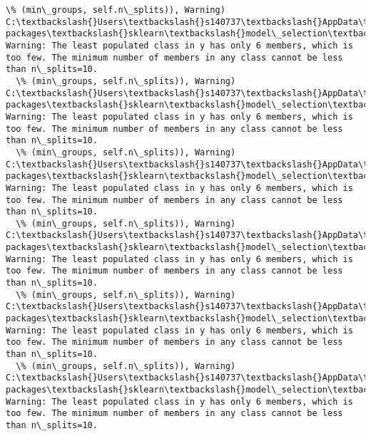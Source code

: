\documentclass[11pt]{article}
\begin{document}
\begin{Verbatim}[commandchars=\\\{\}]
  \% (min\_groups, self.n\_splits)), Warning)
C:\textbackslash{}Users\textbackslash{}s140737\textbackslash{}AppData\textbackslash{}Local\textbackslash{}Continuum\textbackslash{}anaconda3\textbackslash{}lib\textbackslash{}site-packages\textbackslash{}sklearn\textbackslash{}model\_selection\textbackslash{}\_split.py:605: Warning: The least populated class in y has only 6 members, which is too few. The minimum number of members in any class cannot be less than n\_splits=10.
  \% (min\_groups, self.n\_splits)), Warning)
C:\textbackslash{}Users\textbackslash{}s140737\textbackslash{}AppData\textbackslash{}Local\textbackslash{}Continuum\textbackslash{}anaconda3\textbackslash{}lib\textbackslash{}site-packages\textbackslash{}sklearn\textbackslash{}model\_selection\textbackslash{}\_split.py:605: Warning: The least populated class in y has only 6 members, which is too few. The minimum number of members in any class cannot be less than n\_splits=10.
  \% (min\_groups, self.n\_splits)), Warning)
C:\textbackslash{}Users\textbackslash{}s140737\textbackslash{}AppData\textbackslash{}Local\textbackslash{}Continuum\textbackslash{}anaconda3\textbackslash{}lib\textbackslash{}site-packages\textbackslash{}sklearn\textbackslash{}model\_selection\textbackslash{}\_split.py:605: Warning: The least populated class in y has only 6 members, which is too few. The minimum number of members in any class cannot be less than n\_splits=10.
  \% (min\_groups, self.n\_splits)), Warning)
C:\textbackslash{}Users\textbackslash{}s140737\textbackslash{}AppData\textbackslash{}Local\textbackslash{}Continuum\textbackslash{}anaconda3\textbackslash{}lib\textbackslash{}site-packages\textbackslash{}sklearn\textbackslash{}model\_selection\textbackslash{}\_split.py:605: Warning: The least populated class in y has only 6 members, which is too few. The minimum number of members in any class cannot be less than n\_splits=10.
  \% (min\_groups, self.n\_splits)), Warning)
C:\textbackslash{}Users\textbackslash{}s140737\textbackslash{}AppData\textbackslash{}Local\textbackslash{}Continuum\textbackslash{}anaconda3\textbackslash{}lib\textbackslash{}site-packages\textbackslash{}sklearn\textbackslash{}model\_selection\textbackslash{}\_split.py:605: Warning: The least populated class in y has only 6 members, which is too few. The minimum number of members in any class cannot be less than n\_splits=10.
  \% (min\_groups, self.n\_splits)), Warning)
C:\textbackslash{}Users\textbackslash{}s140737\textbackslash{}AppData\textbackslash{}Local\textbackslash{}Continuum\textbackslash{}anaconda3\textbackslash{}lib\textbackslash{}site-packages\textbackslash{}sklearn\textbackslash{}model\_selection\textbackslash{}\_split.py:605: Warning: The least populated class in y has only 6 members, which is too few. The minimum number of members in any class cannot be less than n\_splits=10.

\end{Verbatim}
\end{document}
